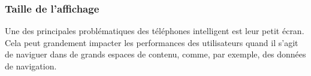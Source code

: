 

\iffalse
\subsubsection*{IHM autres que du IHM multiaffichage}
\paragraph*{}
IHM hybride~: mobile pour entrée, et hmd pour sortie \cite{LeeBudhirajaBillinghurst2013}
\fi


\subsubsection*{Taille de l'affichage}
Une des principales problématiques des téléphones intelligent est leur petit écran. Cela peut grandement impacter les performances des utilisateurs quand il s'agit de naviguer dans de grands espaces de contenu, comme, par exemple, des données de navigation.

